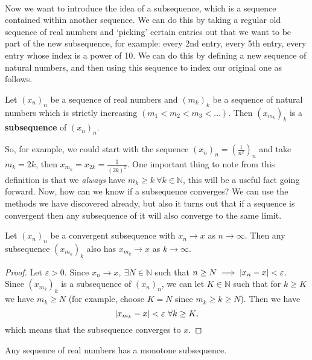 \documentclass[../real_analysis.tex]{subfiles}
\begin{document}
        \paragraph{}
        Now we want to introduce the idea of a subsequence, which is a sequence contained within another sequence. We can do this by taking a regular old sequence of real numbers and `picking' certain entries out that we want to be part of the new subsequence, for example: every 2nd entry, every 5th entry, every entry whose index is a power of 10. We can do this by defining a new sequence of natural numbers, and then using this sequence to index our original one as follows.
        \begin{definition}
            Let $(x_n)_n$ be a sequence of real numbers and $(m_k)_k$ be a sequence of natural numbers which is strictly increasing $(m_1<m_2<m_3<\dots)$. Then $(x_{m_k})_k$ is a \textbf{subsequence} of $(x_n)_n$.
        \end{definition}
        So, for example, we could start with the sequence $(x_n)_n=\left(\frac{1}{n^2}\right)_n$ and take $m_k=2k$, then $x_{m_k}=x_{2k}=\frac{1}{(2k)^2}$. One important thing to note from this definition is that we \textit{always} have $m_k\geq k\ \forall k\in\mathbb{N}$, this will be a useful fact going forward. Now, how can we know if a subsequence converges? We can use the methods we have discovered already, but also it turns out that if a sequence is convergent then any subsequence of it will also converge to the same limit.
        \begin{theorem}
            Let $(x_n)_n$ be a convergent subsequence with $x_n\to x$ as $n\to\infty$. Then any subsequence $(x_{m_k})_k$ also has $x_{m_k}\to x$ as $k\to\infty$.
        \end{theorem}
        \begin{proof}
            Let $\varepsilon>0$. Since $x_n\to x,\ \exists N\in\mathbb{N}$ such that $n\geq N\implies\lvert x_n-x\rvert<\varepsilon$. Since $(x_{m_k})_k$ is a subsequence of $(x_n)_n$, we can let $K\in\mathbb{N}$ such that for $k\geq K$ we have $m_k\geq N$ (for example, choose $K=N$ since $m_k\geq k\geq N$). Then we have
            \begin{equation*}
                \lvert x_{m_k}-x\rvert<\varepsilon\ \forall k\geq K,
            \end{equation*}
            which means that the subsequence converges to $x$.
        \end{proof}
        \begin{theorem}\label{MST}
            Any sequence of real numbers has a monotone subsequence.
        \end{theorem}
\end{document}
